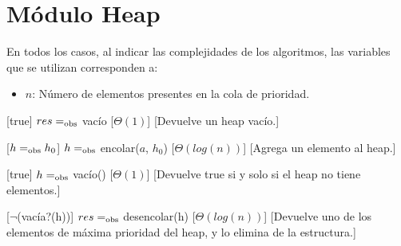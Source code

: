 \section{M\'{o}dulo Heap}

  En todos los casos, al indicar las complejidades de los algoritmos, las variables que se utilizan corresponden a:
  \vspace{-0.5em}\begin{itemize}
    \item $n$: N\'umero de elementos presentes en la cola de prioridad.
  \end{itemize}

\begin{Interfaz}
  
  \begin{paramFormales}
    \paramGeneros{$\alpha$}



  \end{paramFormales}




    [true]
    {$res =_{\mathrm{obs}}$ vac\'{i}o}
    [$\Theta(1)$]
    [Devuelve un heap vac\'io.]

    [$h =_{\mathrm{obs}} h_{0}$]
    {$h =_{\mathrm{obs}}$ encolar($a$, $h_{0}$)}
    [$\Theta(log(n))$]
    [Agrega un elemento al heap.]

    [true]
    {$h =_{\mathrm{obs}}$ vac\'{i}o()}
    [$\Theta(1)$]
    [Devuelve true si y solo si el heap no tiene elementos.]

    [$\neg$(vac\'ia?(h))]
    {$res =_{\mathrm{obs}}$ desencolar(h)}
    [$\Theta(log(n))$]
    [Devuelve uno de los elementos de m\'axima prioridad del heap, y lo elimina de la estructura.]

\end{Interfaz}

